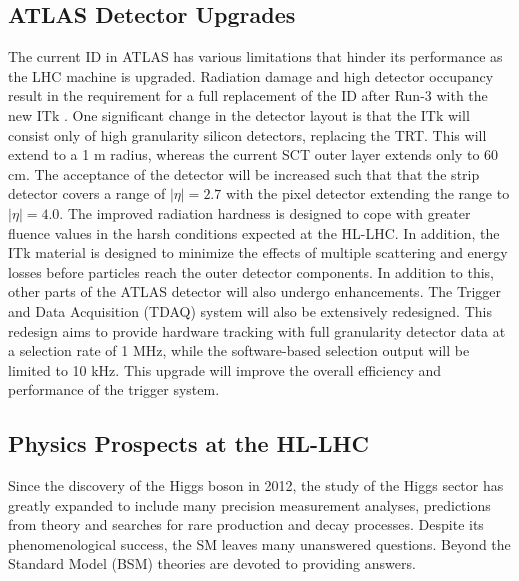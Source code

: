 \subsection{ATLAS Detector Upgrades}
The current ID in ATLAS has various limitations that hinder its performance as the \ac{LHC} machine is upgraded. Radiation damage and high detector occupancy result in the requirement for a full replacement of the ID after Run-3 with the new ITk \cite{pileup,itk-strip}. One significant change in the detector layout is that the ITk will consist only of high granularity silicon detectors, replacing the TRT. This will extend to a 1 m radius, whereas the current SCT outer layer extends only to 60 cm. The acceptance of the detector will be increased such that that the strip detector covers a range of $ \lvert \eta \rvert = 2.7$ with the pixel detector extending the range to $ \lvert \eta \rvert = 4.0$. The improved radiation hardness is designed to cope with greater fluence values in the harsh conditions expected at the HL-LHC. In addition, the ITk material is designed to minimize the effects of multiple scattering and energy losses before particles reach the outer detector components. In addition to this, other parts of the ATLAS detector will also undergo enhancements. The Trigger and Data Acquisition (TDAQ) system will also be extensively redesigned. This redesign aims to provide hardware tracking with full granularity detector data at a selection rate of 1 MHz, while the software-based selection output will be limited to 10 kHz. This upgrade will improve the overall efficiency and performance of the trigger system.


\subsection{Physics Prospects at the HL-LHC}
Since the discovery of the Higgs boson \cite{ATLAS-HIGGS, CMS-HIGGS} in 2012, the study of the Higgs sector has greatly expanded to include many precision measurement analyses, predictions from theory and searches for rare production and decay processes. Despite its phenomenological success, the SM leaves many unanswered questions. Beyond the Standard Model (BSM) theories are devoted to providing answers. 

